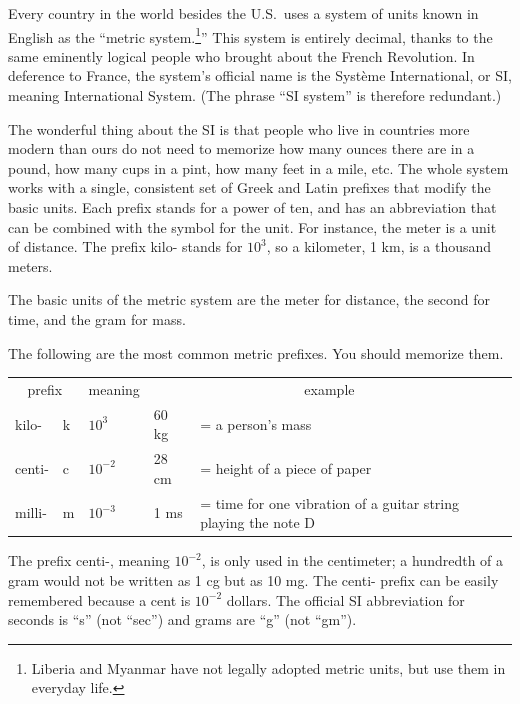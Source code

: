 Every country in the world besides the U.S.~uses a
system of units known in English as the ``metric system.\footnote{Liberia and Myanmar have not legally adopted metric units, but use them
in everyday life.}''
This system is entirely decimal, thanks to the same
eminently logical people who brought about the French Revolution. In deference to France, the
system's official name is the Syst\`{e}me International, or SI,
meaning International System. (The phrase ``SI system'' is
therefore redundant.)

The wonderful thing about the SI is that people who live in
countries more modern than ours do not need to memorize how
many ounces there are in a pound, how many cups in a pint,
how many feet in a mile, etc. The whole system works with a
single, consistent set of Greek and Latin prefixes
that modify the basic units. Each
prefix stands for a power of ten, and has an abbreviation
that can be combined with the symbol for the unit. For
instance, the meter is a unit of distance. The prefix kilo-
stands for $10^3$, so a kilometer, 1 km, is a thousand meters.

The basic units of the metric system are the meter for
distance, the second for time, and the gram for mass.

The following are the most common metric prefixes. You
should memorize them.

\begin{center}
\begin{tabular}{llllp{60mm}}
    \multicolumn{2}{c}{prefix} & meaning & \multicolumn{2}{c}{example} \\
    kilo-  &   k   & $10^3$     &   60 kg     & =  a person's mass  \\
    centi- &   c   & $10^{-2}$  &   28 cm     & =  height of a piece of paper  \\
    milli- &   m   & $10^{-3}$  &   1 ms     & =  time for one vibration of a guitar string playing the note D
\end{tabular}
\end{center}

The prefix centi-, meaning $10^{-2}$, is only used in the
centimeter; a hundredth of a gram would not be written as 1
cg but as 10 mg. The centi- prefix can be easily remembered
because a cent is $10^{-2}$  dollars. The official SI
abbreviation for seconds is ``s'' (not ``sec'') and grams
are ``g'' (not ``gm'').

